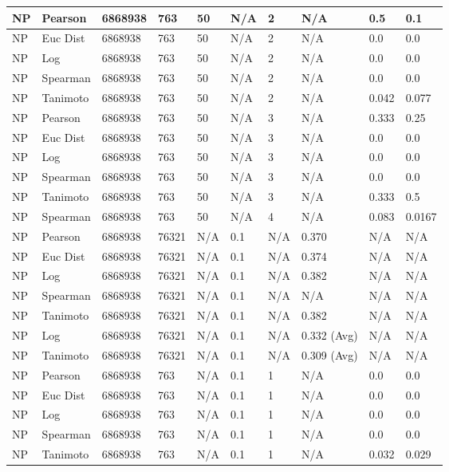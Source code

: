 \documentclass{article}
\begin{document}
\begin{longtable}{ |p{1.7cm}|p{1.9cm}|p{1.5cm}|p{1.5cm}|p{0.75cm}|p{0.75cm}|p{0.75cm}|p{0.75cm}|p{1.5cm}|p{1.5cm}|}
    NP & Pearson & 6868938 & 763 & 50 &  N/A & 2 & N/A & 0.5 & 0.1  \\ \hline
    NP & Euc Dist & 6868938 & 763 & 50 & N/A &  2 & N/A &0.0 & 0.0   \\ \hline
    NP & Log & 6868938 & 763 & 50 &  N/A &  2 & N/A & 0.0 & 0.0 \\ \hline
    NP & Spearman & 6868938 & 763 & 50 & N/A &  2 & N/A & 0.0 & 0.0 \\ \hline
    NP & Tanimoto & 6868938 & 763 & 50 & N/A &  2 & N/A & 0.042 & 0.077 \\ \hline
    
    NP & Pearson & 6868938 & 763 & 50&  N/A & 3 & N/A & 0.333 & 0.25  \\ \hline
    NP & Euc Dist & 6868938 & 763 & 50 & N/A & 3  & N/A &0.0 & 0.0   \\ \hline
    NP & Log & 6868938 & 763 & 50 &  N/A & 3  & N/A & 0.0 & 0.0  \\ \hline
    NP & Spearman & 6868938 & 763 & 50 & N/A & 3  & N/A &0.0 & 0.0 \\ \hline
    NP & Tanimoto & 6868938 & 763 & 50 & N/A & 3 & N/A & 0.333 & 0.5 \\ \hline
    NP & Spearman & 6868938 & 763 & 50 & N/A &  4 & N/A & 0.083 & 0.0167 \\ \hline
    
    NP & Pearson & 6868938 & 76321 & N/A &  0.1 & N/A & 0.370 & N/A & N/A  \\ \hline
    NP & Euc Dist & 6868938 & 76321 & N/A &  0.1 & N/A & 0.374 & N/A & N/A   \\ \hline
    NP & Log & 6868938 & 76321 & N/A &  0.1 & N/A & 0.382 & N/A & N/A  \\ \hline
    NP & Spearman & 6868938 & 76321 & N/A &  0.1 & N/A & N/A & N/A & N/A \\ \hline
    NP & Tanimoto & 6868938 & 76321 & N/A &  0.1 & N/A & 0.382 & N/A & N/A \\ \hline
    NP & Log & 6868938 & 76321 & N/A &  0.1 & N/A & 0.332 (Avg) & N/A & N/A \\ \hline
    NP & Tanimoto & 6868938 & 76321 & N/A &  0.1 & N/A & 0.309 (Avg) & N/A & N/A \\ \hline
    
    NP & Pearson & 6868938 & 763 & N/A &  0.1 & 1 & N/A & 0.0 & 0.0  \\ \hline
    NP & Euc Dist & 6868938 & 763 & N/A &  0.1 & 1 & N/A &0.0 & 0.0   \\ \hline
    NP & Log & 6868938 & 763 & N/A &  0.1 & 1 & N/A & 0.0 & 0.0  \\ \hline
    NP & Spearman & 6868938 & 763 & N/A &  0.1 & 1 & N/A &0.0 & 0.0 \\ \hline
    NP & Tanimoto & 6868938 & 763 & N/A &  0.1 & 1 & N/A & 0.032 & 0.029 \\ \hline
    

\end{longtable}
\end{document}
